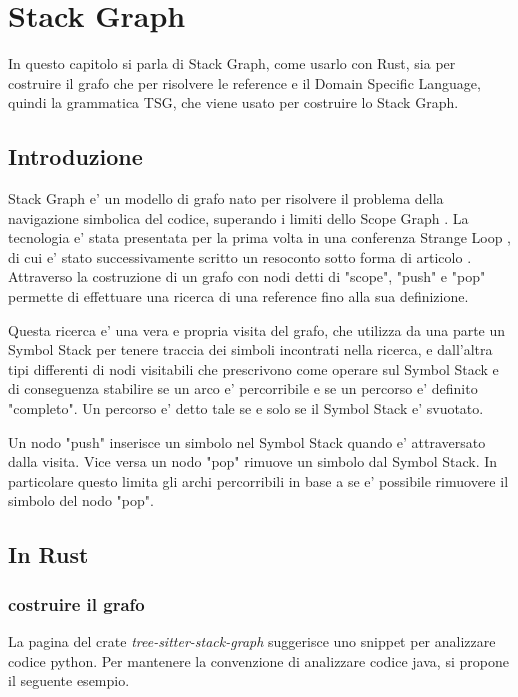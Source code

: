 \chapter{Stack Graph}

In questo capitolo si parla di Stack Graph, come usarlo con Rust, sia per costruire il grafo che per risolvere le reference e il Domain Specific Language, quindi la grammatica TSG, che viene usato per costruire lo Stack Graph.

\section{Introduzione}
Stack Graph \cite{StackGraph} e' un modello di grafo nato per risolvere il problema della navigazione simbolica del codice, superando i limiti dello Scope Graph \cite{ScopeGraph}.
La tecnologia e' stata presentata per la prima volta in una conferenza Strange Loop \cite{StackGraphConference}, di cui e' stato successivamente scritto un resoconto sotto forma di articolo \cite{StackGraphIntro}.
Attraverso la costruzione di un grafo con nodi detti di "scope", "push" e "pop" permette di effettuare una ricerca di una reference fino alla sua definizione.

Questa ricerca e' una vera e propria visita del grafo, che utilizza da una parte un Symbol Stack per tenere traccia dei simboli incontrati nella ricerca, e dall'altra tipi differenti di nodi visitabili che prescrivono come operare sul Symbol Stack e di conseguenza stabilire se un arco e' percorribile e se un percorso e' definito "completo".
Un percorso e' detto tale se e solo se il Symbol Stack e' svuotato.

Un nodo "push" inserisce un simbolo nel Symbol Stack quando e' attraversato dalla visita.
Vice versa un nodo "pop" rimuove un simbolo dal Symbol Stack.
In particolare questo limita gli archi percorribili in base a se e' possibile rimuovere il simbolo del nodo "pop".

\section{In Rust}

\subsection{costruire il grafo}

La pagina del crate \emph{tree-sitter-stack-graph} \cite{TreeSitterStackGraph} suggerisce uno snippet per analizzare codice python.
Per mantenere la convenzione di analizzare codice java, si propone il seguente esempio.

